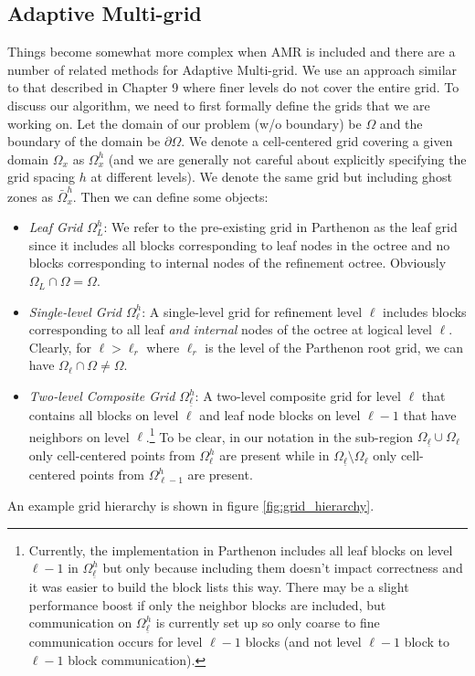 \documentclass{article}
\begin{document}
\subsection{Adaptive Multi-grid} 
Things become somewhat more complex when AMR is included and there are a number of related methods for Adaptive Multi-grid. We use an approach similar to that described in \cite{Trottenburg:2001} Chapter 9 where finer levels do not cover the entire grid. To discuss our algorithm, we need to first formally define the grids that we are working on. Let the domain of our problem (w/o boundary) be $\Omega$ and the boundary of the domain be $\partial \Omega$. We denote a cell-centered grid covering a given domain $\Omega_x$ as $\Omega^h_x$ (and we are generally not careful about explicitly specifying the grid spacing $h$ at different levels). We denote the same grid but including ghost zones as $\bar \Omega^h_x$.  Then we can define some objects: 
\begin{itemize}
    \item {\it Leaf Grid $\Omega^h_L$}: We refer to the pre-existing grid in Parthenon as the leaf grid since it includes all blocks corresponding to leaf nodes in the octree and no blocks corresponding to internal nodes of the refinement octree. Obviously $\Omega_L \cap \Omega = \Omega$. 
    \item {\it Single-level Grid $\Omega^h_\ell$}: A single-level grid for refinement level $\ell$ includes blocks corresponding to all leaf {\it and internal} nodes of the octree at logical level $\ell$. Clearly, for $\ell > \ell_r$ where $\ell_r$ is the level of the Parthenon root grid, we can have $\Omega_\ell \cap \Omega \ne \Omega$. 
    \item {\it Two-level Composite Grid $\Omega^h_{\underline \ell}$}: A two-level composite grid for level $\ell$ that contains all blocks on level $\ell$ and leaf node blocks on level $\ell - 1$ that have neighbors on level $\ell$.\footnote{Currently, the implementation in Parthenon includes all leaf blocks on level $\ell-1$ in $\Omega^h_{\underline \ell}$ but only because including them doesn't impact correctness and it was easier to build the block lists this way. There may be a slight performance boost if only the neighbor blocks are included, but communication on $\Omega^h_{\underline \ell}$ is currently set up so only coarse to fine communication occurs for level $\ell-1$ blocks (and not level $\ell-1$ block to $\ell-1$ block communication).}  To be clear, in our notation in the sub-region $\Omega_{\underline \ell} \cup \Omega_{\ell}$ only cell-centered points from $\Omega^h_{\ell}$ are present while in $\Omega_{\underline \ell} \setminus \Omega_{\ell}$ only cell-centered points from $\Omega^h_{\ell - 1}$ are present.  
\end{itemize}  
An example grid hierarchy is shown in figure \ref{fig:grid_hierarchy}.
\end{document}
